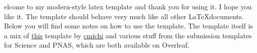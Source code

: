 elcome to my modern-style latex template and thank you for using it. I hope you like it. The template should behave very much like all other \LaTeX documents. Below you will find some notes on how to use the template. The template itself is a mix of \href{https://github.com/cmichi/latex-template-collection}{this} template by \href{https://github.com/cmichi}{cmichi} and various stuff from the submission templates for Science and PNAS, which are both available on Overleaf.